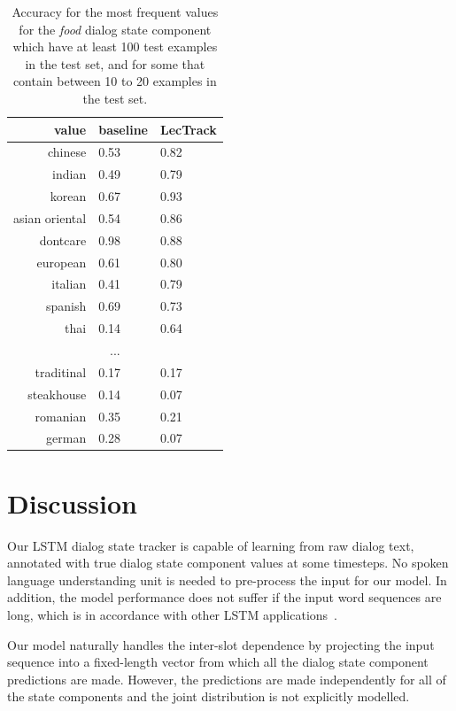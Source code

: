 \documentclass[11pt,twocolumn]{article}
\begin{document}
\begin{table}
    \centering
    \begin{tabular}{|r|ll|}
    \hline
               value & baseline & LecTrack \\
    \hline
             chinese   & 0.53   & 0.82   \\
              indian   & 0.49   & 0.79   \\
              korean   & 0.67   & 0.93   \\
      asian oriental   & 0.54   & 0.86   \\
            dontcare   & 0.98   & 0.88   \\
            european   & 0.61   & 0.80   \\
             italian   & 0.41   & 0.79   \\
             spanish   & 0.69   & 0.73   \\
                thai   & 0.14   & 0.64   \\
    \multicolumn{3}{|c|}{...} \\
                traditinal  & 0.17  & 0.17 \\
               steakhouse   & 0.14  & 0.07 \\
                romanian    & 0.35  & 0.21 \\
                german      & 0.28  & 0.07 \\
    \hline
    \end{tabular}

    \medskip
    \caption{Accuracy for the most frequent values for the \emph{food} dialog state component which have at least 100 test examples in the test set, and for some that contain between 10 to 20 examples in the test set.}
    \label{table:resultsFreq}
\end{table}

\section{Discussion}
\label{sec:discussion}
Our LSTM dialog state tracker is capable of learning from raw dialog text, annotated with true dialog state component values at some timesteps. No spoken language understanding unit is needed to pre-process the input for our model. In addition, the model performance does not suffer if the input word sequences are long, which is in accordance with other LSTM applications~\cite{sutskever2014sequence}.

Our model naturally handles the inter-slot dependence by projecting the input sequence into a fixed-length vector from which all the dialog state component predictions are made. However, the predictions are made independently for all of the state components and the joint distribution is not explicitly modelled.
\end{document}
